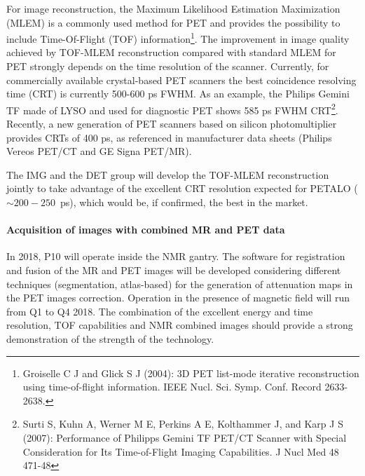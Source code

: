 For image reconstruction, the Maximum Likelihood Estimation Maximization
(MLEM) is a commonly used method for PET and provides the possibility to include
Time-Of-Flight (TOF) information\footnote{Groiselle C J and Glick S J (2004): 3D PET list-mode iterative reconstruction using time-of-flight
information. IEEE Nucl. Sci. Symp. Conf. Record 2633-2638.}. The improvement in image quality achieved by TOF-MLEM reconstruction compared with standard MLEM for PET strongly depends
on the time resolution of the scanner. Currently, for commercially available crystal-based PET scanners the best coincidence resolving time (CRT) is currently   500-600 ps FWHM. As an example, the Philips Gemini TF made of LYSO and used for diagnostic PET shows 585 ps FWHM CRT\footnote{Surti S, Kuhn A, Werner M E, Perkins A E, Kolthammer J, and Karp J S (2007): Performance of
Philipps Gemini TF PET/CT Scanner with Special Consideration for Its Time-of-Flight Imaging
Capabilities. J Nucl Med 48 471-48}.
Recently, a new generation of PET scanners based on silicon photomultiplier provides
CRTs of 400 ps, as referenced in manufacturer data sheets (Philips Vereos PET/CT and
GE Signa PET/MR).

The IMG and the DET group will develop the TOF-MLEM reconstruction jointly to take advantage of the excellent CRT resolution expected for PETALO ($\sim 200-250$~ps), which would be, if confirmed, the best in the market. 

\paragraph{Acquisition of images with combined MR and PET data}
In 2018, P10 will operate inside the NMR gantry. 
The software for registration and fusion of the MR and PET images will be developed considering different techniques (segmentation, atlas-based) for the generation of attenuation maps in the PET images correction. Operation in the presence of magnetic field will run from Q1 to Q4 2018. The combination of the excellent energy and time resolution, TOF capabilities and NMR combined images should provide a strong demonstration of the strength of the technology. 

